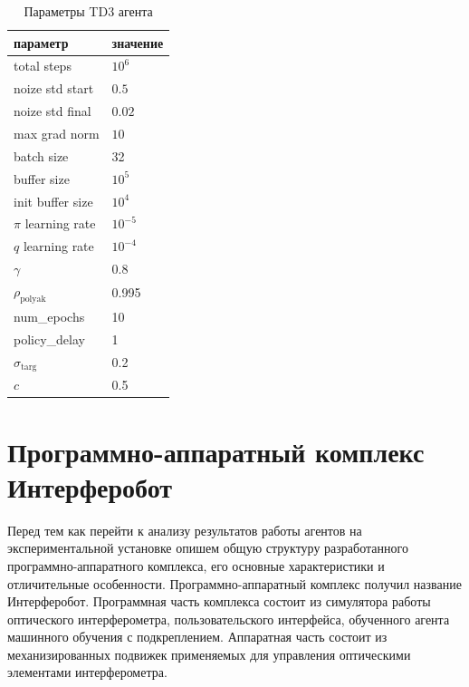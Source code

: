 \begin{table} [htbp]
    \centering
    \begin{threeparttable}%
        \caption{Параметры TD3 агента}\label{tab:td3_params}%
        \begin{tabular}{| p{5cm} || p{5cm} |}
            \hline
            \hline
            параметр & значение \\
            \hline
            total steps & $10^6$ \\
            noize std start & $0.5$ \\
            noize std final & $0.02$ \\
            max grad norm & $10$ \\
            batch size & 32 \\
            buffer size & $10^5$ \\
            init buffer size & $10^4$ \\
            $\pi$ learning rate & $10^{-5}$ \\
            $q$ learning rate & $10^{-4}$ \\
            $\gamma$ & 0.8 \\
            $\rho_{\mathrm{polyak}}$ & 0.995 \\
            num\_epochs & 10  \\
            policy\_delay & 1 \\
            $\sigma_{\mathrm{targ}}$ & 0.2 \\
            $c$ & 0.5 \\
            \hline
            \hline
        \end{tabular}
    \end{threeparttable}
\end{table}

        

\section{Программно-аппаратный комплекс Интерферобот}

Перед тем как перейти к анализу результатов работы агентов на экспериментальной установке опишем общую структуру разработанного программно-аппаратного комплекса, его основные характеристики и отличительные особенности. Программно-аппаратный комплекс получил название Интерферобот. Программная часть комплекса состоит из симулятора работы оптического интерферометра, пользовательского интерфейса, обученного агента машинного обучения с подкреплением. Аппаратная часть состоит из механизированных подвижек применяемых для управления оптическими элементами интерферометра. 

